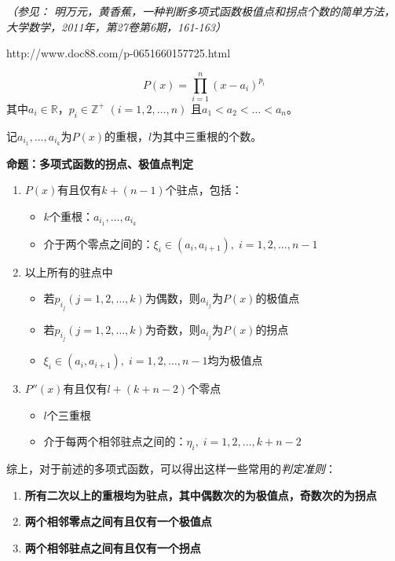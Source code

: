 \begin{shaded}
	{\it（参见： 明万元，黄香蕉，一种判断多项式函数极值点和拐点个数的简单方法，
	大学数学，2011年，第27卷第6期，161-163）
	
	http://www.doc88.com/p-0651660157725.html}
	$$P(x)=\prod_{i=1}^n(x-a_i)^{p_i}$$
	其中$a_i\in\mathbb{R}$，$p_i\in\mathbb{Z}^+\;(i=1,2,\ldots,n)$
	且$a_1<a_2<\ldots<a_n$。
	
	记$a_{i_1},\ldots,a_{i_k}$为$P(x)$的重根，$l$为其中三重根的个数。
	
	{\bf 命题：}{\bf 多项式函数的拐点、极值点判定}
	\begin{enumerate}
  	  \setlength{\itemindent}{1cm}
	  \item $P(x)$有且仅有$k+(n-1)$个驻点，包括：
	  \begin{itemize}
	    \setlength{\itemindent}{0.5cm}
	    \item $k$个重根：$a_{i_1},\ldots,a_{i_k}$
	    \item 介于两个零点之间的：$\xi_i\in(a_i,a_{i+1}),\;i=1,2,\ldots,n-1$
	  \end{itemize}
	  \item 以上所有的驻点中
	  \begin{itemize}
	    \setlength{\itemindent}{0.5cm}
	    \item 若$p_{i_j}(j=1,2,\ldots,k)$为偶数，则$a_{i_j}$为$P(x)$的极值点
	    \item 若$p_{i_j}(j=1,2,\ldots,k)$为奇数，则$a_{i_j}$为$P(x)$的拐点
	    \item $\xi_i\in(a_i,a_{i+1}),\;i=1,2,\ldots,n-1$均为极值点
	  \end{itemize}
	  \item $P''(x)$有且仅有$l+(k+n-2)$个零点
	  \begin{itemize}
	    \setlength{\itemindent}{0.5cm}
	    \item $l$个三重根
	    \item 介于每两个相邻驻点之间的：$\eta_i,\;i=1,2,\ldots,k+n-2$
	  \end{itemize}
	\end{enumerate}
	
	综上，对于前述的多项式函数，可以得出这样一些常用的{\it 判定准则}：
	\begin{enumerate}[(1)]
  	  \setlength{\itemindent}{1cm}
	  \item {\bf 所有二次以上的重根均为驻点，其中偶数次的为极值点，奇数次的为拐点}
	  \item {\bf 两个相邻零点之间有且仅有一个极值点}
	  \item {\bf 两个相邻驻点之间有且仅有一个拐点}
	\end{enumerate}
	

\end{shaded}
